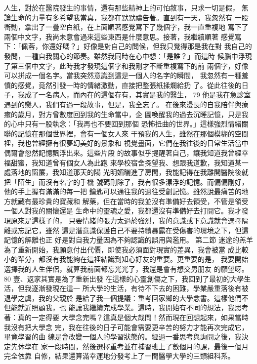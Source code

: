 人生，對於在醫院發生的事情，還有那些精神上的可怕敘事，只求一切是假，
無論生命的力量有多希望我當真，我都在默默禱告著。直到有一天，我忽然有
一股衝動，拿出了一疊空白紙，在上面順著感覺寫下了幾個字，我一直重複地
寫下了兩個中文字，我尚未意會過來這些東西是什麼意思。接著，我繼續順著
感覺寫下：「佩蓉，你還好嗎？」好像是對自己的問候，但我只覺得那是我在對
我自己的發問，一種自我關心的節奏。雖然我同時在心中想：「是誰？」而這時
候腦中浮現了第三個中文字，此時我才發現這個字和我剛才不斷重複寫下的前
兩個字，好像可以拼成一個名字。當我突然意識到這是一個人的名字的瞬間，
我忽然有一種羞憤的感覺，竟然引發一時的情緒激動，直接把整張紙揉爛給扔
了。從此往後的日子，我成了一名病人，而內在的這個存有，其實是我的醫生，
79 
他是我在急診室遇到的戀人，我們有過一段故事，但是，我全忘了。 
在後來漫長的自我陪伴與療癒的歲月，對方曾數度回到我的生命當中，企
圖喚醒我的過去沉睡記憶，只是我的心中只有一股執念：「我再也不要回到那個
恐怖扭曲的世界。」這樣強烈情緒關聯的記憶在那個世界裡，會有一個女人來
干預我的人生，雖然在那個模糊的空間裡，我也曾經擁有很夢幻美好的景象和
視覺畫面，它們在我往後的日常生活當中偶爾會忽然記憶飄浮出來。這些片段
的故事似乎提醒著自己，讓我知道我曾經幸福甜蜜，我知道曾有個女人為此跑
來學校宿舍探望我、想跟我道歉，我知道某一處落地的窗簾，我知道那天的陽
光明媚曬進了房間，我能記得在我離開醫院後就把「陌生」而沒有名字的手機
號碼刪除了，我有很多漂浮的記憶。而偏偏剛好，他的手上握有滿滿的每一把
鑰匙可以通往我的過往受創記憶。雖然說最痛苦的地方就藏有最珍貴的寶藏和
解藥，但在當時的我並沒有準備好去領受，不管是領受一個人對我的關懷還是
生命中的靈魂之愛，我都還沒有準備好去打開它。我才發現原來是這樣子的，
只要情緒的張力太過於強烈，我的意識或下意識就會選擇隔離或忘記它，雖然
這是潛意識保護自己不要持續暴露在受傷害的環境之下，但這記憶的解離也正
好是對自我力量因為不夠認識的誤用與濫用。 
第二節 迷途的羔羊 
為了重新開始，我願意付出代價，即使我必須面對現實的差異，我會被當
成比較小的輩分，都沒有我能夠在這裡結識到知心好友的重要。更重要的是，
我要開始選擇我的人生伴侶，就算我前面都忘光光了，我還是會有想交男朋友
的願望呀。 
80 
壹、返家其實是為了重新出發 
在這樣的心靈創傷之下，我回到了最初的大學生活，但我逐漸發現在這一
所大學的生活，有待不下去的困難，學業嚴重落後有被退學之虞，我的父親於
是給了我一個提議：重考回家鄉的大學念書。這樣他們不但能就近照顧我，也
能讓我繼續完成學業。這時，我開始有不同的想法，我思考著：真的一定得要
大學念完嗎？這真是個大哉問！然而現在回想起來，如果當時我沒有把大學念
完，我在往後的日子可能會需要更辛苦的努力才能再次完成它，畢竟學習的曲
線是會改變一個人的學習狀態的。經過一番思考與詢問之後，我決定先休學在
家一段時間，然後選擇重考並在補習班上了數個月的課，最後一個月完全依靠
自修，結果還算滿幸運地分發考上了一間醫學大學的三類組科系。 
